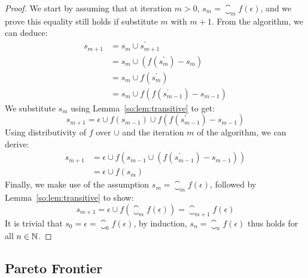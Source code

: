 \begin{proof}
    We start by assuming that at iteration $m > 0$, $s_m = \closure_m
    f(\epsilon)$, and we prove this equality still holds if substitute $m$ with
    $m + 1$.  From the algorithm, we can deduce:
    \begin{equation*}
    \begin{aligned}
        s_{m+1}
         &= s_m \cup s^\prime_{m+1} \\
         &= s_m \cup \left( f \left( s^\prime_m \right) - s_m \right) \\
         &= s_m \cup f \left( s^\prime_m \right) \\
         &= s_m \cup f \left(
                f \left( s^\prime_{m-1} \right) - s_{m-1}
            \right)
    \end{aligned}
    \end{equation*}
    We substitute $s_m$ using Lemma~\ref{so:lem:transitive} to get:
    \begin{equation*}
        s_{m+1}
          = \epsilon \cup f \left( s_{m-1} \right) \cup
            f \left(
                f \left( s^\prime_{m-1} \right) - s_{m-1}
            \right)
    \end{equation*}
    Using distributivity of $f$ over $\cup$ and the iteration $m$ of the
    algorithm, we can derive:
    \begin{equation*}
    \begin{aligned}
        s_{m+1}
         &= \epsilon \cup f \left(
                s_{m-1} \cup \left(
                    f \left( s^\prime_{m-1} \right) - s_{m-1}
                \right)
            \right) \\
         &= \epsilon \cup f \left( s_m \right)
    \end{aligned}
    \end{equation*}
    Finally, we make use of the assumption $s_m = \closure_m f(\epsilon)$,
    followed by Lemma~\ref{so:lem:transitive} to show:
    \begin{equation*}
        s_{m+1}
        = \epsilon \cup f \left(
            \closure_m f(\epsilon)
        \right)
        = \closure_{m+1} f(\epsilon)
    \end{equation*}
    It is trivial that $s_0 = \epsilon = \closure_0 f(\epsilon)$, by induction,
    $s_n = \closure_n f(\epsilon)$ thus holds for all $n \in \mathbb{N}$.
\end{proof}


\subsection{Pareto Frontier}

